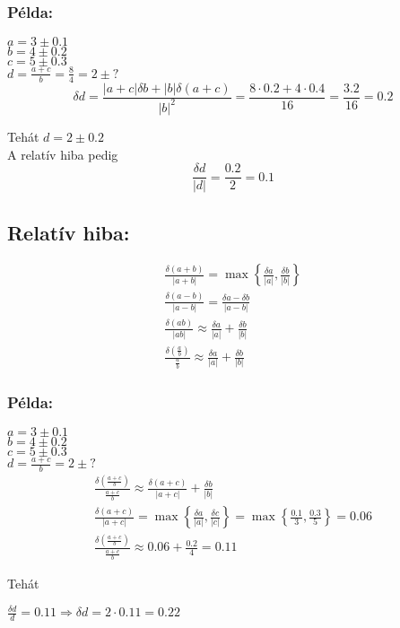 \documentclass[11pt]{article}
\begin{document}
			\subsubsection{Példa:}
			$a = 3 \pm 0.1$\\
			$b = 4 \pm 0.2$\\
			$c = 5 \pm 0.3$\\
			$d = \frac{a+c}{b} = \frac{8}{4} = 2 \pm ?$
			\begin{equation}
				\delta d =  \frac{|a+c|\delta b + |b|\delta(a+c)}{|b|^2} =\frac{8\cdot 0.2 + 4 \cdot 0.4}{16} = \frac{3.2}{16} = 0.2 
			\end{equation}
			
			Tehát
			$d = 2 \pm 0.2$\\
			
			A relatív hiba pedig
			\begin{equation}
				\frac{\delta d}{|d|} = \frac{0.2}{2} = 0.1
			\end{equation}
			\newpage
			
		\subsection{Relatív hiba:}
			\begin{gather}
				\frac{\delta(a+b)}{|a+b|} = \max \left\{\frac{\delta a}{|a|} , \frac{\delta b}{|b|}\right\}\\
				\frac{\delta(a-b)}{|a-b|} = \frac{\delta a - \delta b}{|a-b|}\\
				\frac{\delta(ab)}{|ab|} \approx \frac{\delta a}{|a|} + \frac{\delta b}{|b|}\\
				\frac{\delta \left(\frac{a}{b}\right)}{\frac{a}{b}} \approx \frac{\delta a}{|a|} + \frac{\delta b}{|b|}
			\end{gather}
			
			\subsubsection{Példa:}
				$a = 3 \pm 0.1$\\
				$b = 4 \pm 0.2$\\
				$c = 5 \pm 0.3$\\
				$d = \frac{a+c}{b} = 2 \pm ?$
				\begin{gather}
					\frac{\delta \left(\frac{a + c}{b}\right)}{\frac{a + c}{b}} \approx \frac{\delta (a + c)}{|a+c|} + \frac{\delta b}{|b|}\\
					\frac{\delta (a + c)}{|a+c|} = \max \left\{\frac{\delta a}{|a|} , \frac{\delta c}{|c|}\right\} = \max \left\{\frac{0.1}{3} , \frac{0.3}{5}\right\} = 0.06\\
					\frac{\delta \left(\frac{a + c}{b}\right)}{\frac{a + c}{b}} \approx 0.06 + \frac{0.2}{4} = 0.11
				\end{gather}
				
				Tehát
				
				$\frac{\delta d}{d} = 0.11 \Rightarrow \delta d = 2 \cdot 0.11 = 0.22$
				
\end{document}
